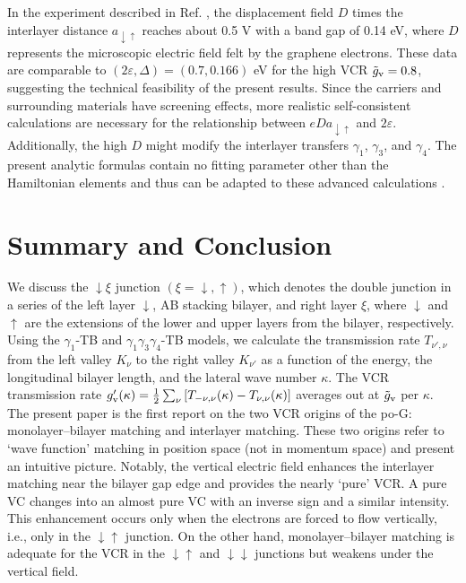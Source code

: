 \documentclass{jpsj3}
\begin{document}
In the experiment described in Ref. \cite{recent-experiment} , the displacement field $D$ times the interlayer distance
$a_{\downarrow\uparrow}$ reaches about 0.5 V with a band gap of 0.14 eV,
where $D$ represents the microscopic electric field felt by the graphene
electrons.
These data are comparable to $(2\varepsilon, \Delta)=(0.7, 0.166)$ eV for the high VCR
$\tilde{g}_{\rm v} =0.8$, suggesting the technical feasibility of the present results.
Since the carriers and surrounding materials have screening effects,
more realistic self-consistent calculations are necessary for the relationship between $eDa_{\downarrow\uparrow}$ and $2\varepsilon$. 
Additionally, the high $D$ might modify the interlayer
transfers $\gamma_1$, $\gamma_3$, and $\gamma_4$. 
The present analytic formulas 
contain no fitting parameter other than the Hamiltonian
elements and thus can be adapted to these advanced calculations
\cite{a12.,(11)}.










\section{Summary and Conclusion}
We discuss the $\downarrow\xi$ junction $(\xi = \downarrow, \uparrow)$, 
 which denotes the double junction
in a series of the left layer $\downarrow$, AB stacking bilayer, and right
layer $\xi$, where $\downarrow$ and $\uparrow$ are the extensions
of the lower and upper layers from the bilayer, respectively.
Using the $\gamma_1$-TB and $\gamma_1\gamma_3\gamma_4$-TB models,
we calculate the transmission rate $T_{\nu',\nu}$
from the left valley $K_{\nu}$
to the right valley $K_{\nu'}$ 
as a function of the energy,
the longitudinal bilayer length,  
and the lateral wave number $\kappa$.
The VCR transmission rate
$g'_{\rm v} (\kappa)=\frac{1}{2}\sum_{\nu}\left [ T_{-\nu,\nu}(\kappa)
- T_{\nu,\nu}(\kappa) \right ]$ averages out at $\tilde{g}_{\rm v}$ per $\kappa$.
The present paper is the first report on
the two VCR origins of the po-G: monolayer--bilayer matching
and interlayer matching.
These two origins refer to `wave function' matching in
position space (not in momentum space) and present an intuitive picture.
Notably, the vertical electric field
enhances the interlayer matching near the bilayer gap edge and provides
the nearly `pure' VCR.
A pure VC changes into an almost pure VC with an inverse sign
and a similar intensity. 
This enhancement occurs only when the electrons are forced to flow vertically, i.e., only in the $\downarrow\uparrow$ junction.
On the other hand, monolayer--bilayer matching is adequate for
the VCR in the $\downarrow\uparrow$ and $\downarrow\downarrow$ 
junctions but weakens under the vertical field.
\end{document}
